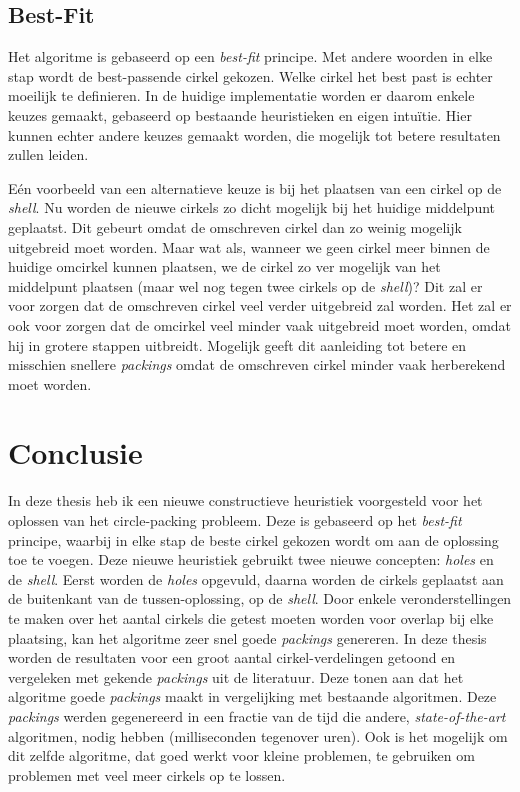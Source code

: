 \documentclass[12pt,a4paper,oneside]{book}
\begin{document}
\section{Best-Fit}

Het algoritme is gebaseerd op een \textit{best-fit} principe.
Met andere woorden in elke stap wordt de best-passende cirkel gekozen.
Welke cirkel het best past is echter moeilijk te definieren.
In de huidige implementatie worden er daarom enkele keuzes gemaakt, gebaseerd op bestaande heuristieken en eigen intuïtie.
Hier kunnen echter andere keuzes gemaakt worden, die mogelijk tot betere resultaten zullen leiden.

Eén voorbeeld van een alternatieve keuze is bij het plaatsen van een cirkel op de \textit{shell}.
Nu worden de nieuwe cirkels zo dicht mogelijk bij het huidige middelpunt geplaatst.
Dit gebeurt omdat de omschreven cirkel dan zo weinig mogelijk uitgebreid moet worden.
Maar wat als, wanneer we geen cirkel meer binnen de huidige omcirkel kunnen plaatsen, we de cirkel zo ver mogelijk van het middelpunt plaatsen (maar wel nog tegen twee cirkels op de \textit{shell})?
Dit zal er voor zorgen dat de omschreven cirkel veel verder uitgebreid zal worden.
Het zal er ook voor zorgen dat de omcirkel veel minder vaak uitgebreid moet worden, omdat hij in grotere stappen uitbreidt.
Mogelijk geeft dit aanleiding tot betere en misschien snellere \textit{packings} omdat de omschreven cirkel minder vaak herberekend moet worden.

\chapter{Conclusie} \label{chap:conclusie}

In deze thesis heb ik een nieuwe constructieve heuristiek voorgesteld voor het oplossen van het circle-packing probleem.
Deze is gebaseerd op het \textit{best-fit} principe, waarbij in elke stap de beste cirkel gekozen wordt om aan de oplossing toe te voegen.
Deze nieuwe heuristiek gebruikt twee nieuwe concepten: \textit{holes} en de \textit{shell}.
Eerst worden de \textit{holes} opgevuld, daarna worden de cirkels geplaatst aan de buitenkant van de tussen-oplossing, op de \textit{shell}.
Door enkele veronderstellingen te maken over het aantal cirkels die getest moeten worden voor overlap bij elke plaatsing, kan het algoritme zeer snel goede \textit{packings} genereren.
In deze thesis worden de resultaten voor een groot aantal cirkel-verdelingen getoond en vergeleken met gekende \textit{packings} uit de literatuur.
Deze tonen aan dat het algoritme goede \textit{packings} maakt in vergelijking met bestaande algoritmen.
Deze \textit{packings} werden gegenereerd in een fractie van de tijd die andere, \textit{state-of-the-art} algoritmen, nodig hebben (milliseconden tegenover uren).
Ook is het mogelijk om dit zelfde algoritme, dat goed werkt voor kleine problemen, te gebruiken om problemen met veel meer cirkels op te lossen.
\end{document}
